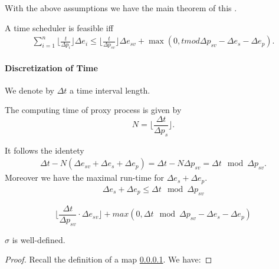 With the above assumptions we have the main theorem of this \cite{K}.
\begin{theorem}
A time scheduler is feasible iff 
	\begin{align}
	\sum_{i=1}^n \lfloor \frac{t}{\Delta p_i} \rfloor \Delta e_i \leq \lfloor  \frac{t}{\Delta p_{sv}} \rfloor \Delta e_{sv} + \max (0,t  mod \Delta p_{sv} -\Delta e_{s} -\Delta e_p).
	\end{align}
\end{theorem}

 
\paragraph{Discretization of Time}
We denote by $\Delta t$ a time interval length.  
\begin{definition}
The computing time of proxy process is given by 
\begin{equation}
N = \lfloor \frac{\Delta t}{\Delta p_s} \rfloor.
\end{equation}
\end{definition} 


It follows the identety
\begin{align}
\Delta t - N ( \Delta e_{sv} + \Delta e_{s} + \Delta e_{p} ) = \Delta t - N \Delta p_{sv} = \Delta t \mod \Delta p_{sv}.
\end{align}
Moreover we have the maximal run-time for $\Delta e_s + \Delta e_p$.
\begin{align}
\Delta e_s + \Delta e_p \leq \Delta t \mod \Delta p_{sv}
\end{align} 

\begin{equation}
\lfloor \frac{\Delta t}{ \Delta p_{sv}} \cdot \Delta e_{sv} \rfloor + max ( 0, \Delta t \mod \Delta p_{sv} - \Delta e_{s} - \Delta e_{p})
\end{equation}
 

\begin{lemma}
 $\sigma$ is well-defined.
\end{lemma}
\begin{proof}
Recall the definition of a map \ref{}. We have:
\end{proof}

